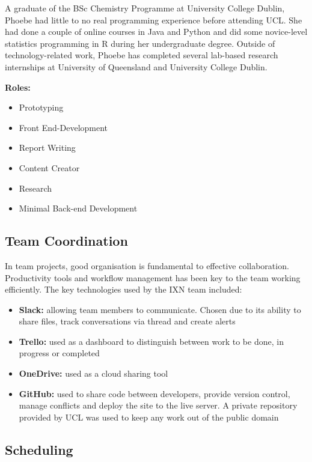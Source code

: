 \documentclass[fontsize=11pt]{extarticle}
\numberwithin{figure}{section} %
\providecommand{\tightlist}{%
  \setlength{\itemsep}{0pt}\setlength{\parskip}{0pt}}
\begin{document}
A graduate of the BSc Chemistry Programme at University College Dublin,
Phoebe had little to no real programming experience before attending
UCL. She had done a couple of online courses in Java and Python and did
some novice-level statistics programming in R during her undergraduate
degree. Outside of technology-related work, Phoebe has completed several
lab-based research internships at University of Queensland and
University College Dublin.

\textbf{Roles:}

\begin{itemize}
\tightlist
\item
  Prototyping
\item
  Front End-Development
\item
  Report Writing
\item
  Content Creator
\item
  Research
\item
  Minimal Back-end Development
\end{itemize}

\hypertarget{team-coordination}{%
\subsection{Team Coordination}\label{team-coordination}}

In team projects, good organisation is fundamental to effective
collaboration. Productivity tools and workflow management has been key
to the team working efficiently. The key technologies used by the IXN
team included:

\begin{itemize}
\tightlist
\item
  \textbf{Slack:} allowing team members to communicate. Chosen due to
  its ability to share files, track conversations via thread and create
  alerts
\item
  \textbf{Trello:} used as a dashboard to distinguish between work to be
  done, in progress or completed
\item
  \textbf{OneDrive:} used as a cloud sharing tool
\item
  \textbf{GitHub:} used to share code between developers, provide
  version control, manage conflicts and deploy the site to the live
  server. A private repository provided by UCL was used to keep any work
  out of the public domain
\end{itemize}

\hypertarget{scheduling}{%
\subsection{Scheduling}\label{scheduling}}
\end{document}
